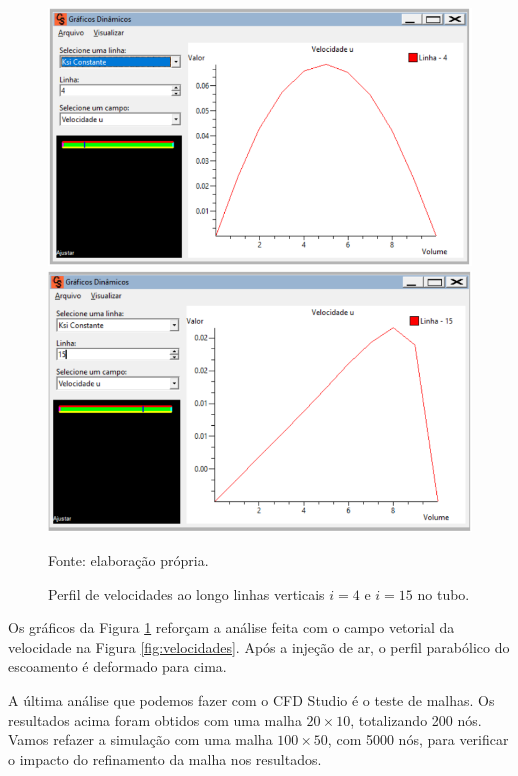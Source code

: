 \begin{figure}[h!]
    \caption{Perfil de velocidades ao longo linhas verticais $i = 4$ e $i = 15$ no tubo.}
    \label{fig:velocidadesLinha}
    \centering
    \centerline{\includegraphics[scale=0.5]{velocidadeLinha4.png}}
    \centerline{\includegraphics[scale=0.5]{velocidadeLinha15.png}}
    \par{Fonte: elaboração própria.}
\end{figure}

Os gráficos da Figura \ref*{fig:velocidadesLinha} reforçam a análise feita com o campo vetorial da velocidade 
na Figura \ref*{fig:velocidades}. Após a injeção de ar, o perfil parabólico do escoamento é deformado
para cima.

A última análise que podemos fazer com o CFD Studio é o teste de malhas. Os resultados acima 
foram obtidos com uma malha $20 \times 10$, totalizando 200 nós. Vamos refazer a simulação com
uma malha $100 \times 50$, com 5000 nós, para verificar o impacto do refinamento da malha nos resultados.




